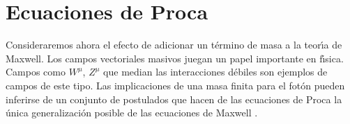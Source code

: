 \section{Ecuaciones de Proca}
\label{sec:ecuacion-de-proca}
\begin{frame}


Consideraremos ahora el efecto de adicionar un t\'ermino de masa a la teor\'\i a de
Maxwell. Los campos vectoriales masivos juegan un papel importante en
f\'\i sica. Campos como $W^\mu$, $Z^\mu$ que median las interacciones d\'ebiles
son ejemplos de campos de este tipo. Las implicaciones de una masa
finita para el fot\'on pueden inferirse de un conjunto de postulados que
hacen de las ecuaciones de Proca la \'unica generalizaci\'on posible de
las ecuaciones de Maxwell \cite{Goldhaber:1971mr}. 


\end{frame}
